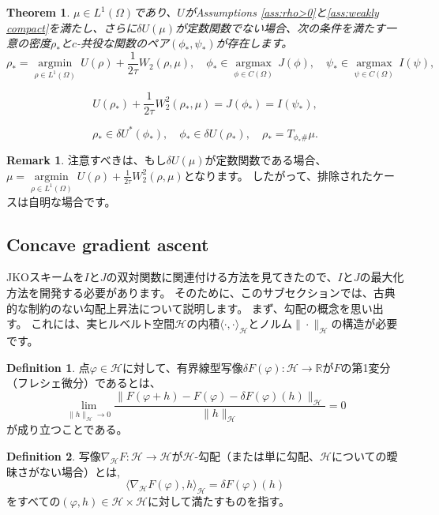 \documentclass{jsarticle}
\newtheorem{thm}{Theorem}[section]
\theoremstyle{definition}
\newtheorem{dfn}{Definition}[section]
\newtheorem{rem}{Remark}[section]
\begin{document}
{\color{teal}
\begin{thm}
\label{thm: duality}
    $\mu \in L^1(\Omega)$であり、$U$がAssumptions \ref{ass:rho>0}と\ref{ass:weakly compact}を満たし、さらに$\delta U(\mu)$が定数関数でない場合、次の条件を満たす一意の密度$\rho_*$と$c$-共役な関数のペア$(\phi_*, \psi_*)$が存在します。
\begin{equation*}
    \rho_* = \underset{\rho \in L^1(\Omega)} {\operatorname{argmin}} \, U(\rho) + \frac{1}{2\tau} W_2(\rho, \mu), \quad \phi_* \in \underset{\phi \in C(\Omega)} {\operatorname{argmax}} \, J(\phi), \quad \psi_* \in \underset{\psi \in C(\Omega)} {\operatorname{argmax}} \, I(\psi),
\end{equation*}

\begin{equation*}
U(\rho_*) + \frac{1}{2\tau} W_2^2(\rho_*,\mu) = J(\phi_*) = I(\psi_*), 
\end{equation*}

\begin{equation*}
    \rho_* \in \delta U^*(\phi_*), \quad \phi_* \in \delta U(\rho_*), \quad \rho_* = T_{\phi_* \#} \mu.
\end{equation*}
\end{thm}
}

\begin{rem}
    注意すべきは、もし$\delta U(\mu)$が定数関数である場合、$\mu = \underset{\rho \in L^1(\Omega)} {\operatorname{argmin}} \, U(\rho) + \frac{1}{2\tau} W_2^2(\rho, \mu)$となります。
    したがって、排除されたケースは自明な場合です。
\end{rem}

\subsection{Concave gradient ascent}
\label{sect:Concave gradient ascent}

JKOスキームを$I$と$J$の双対関数に関連付ける方法を見てきたので、$I$と$J$の最大化方法を開発する必要があります。
そのために、このサブセクションでは、古典的な制約のない勾配上昇法について説明します。
まず、勾配の概念を思い出す。
これには、実ヒルベルト空間$\mathcal{H}$の内積$\langle\cdot,\cdot\rangle_\mathcal{H}$とノルム$\|\cdot\|_\mathcal{H}$の構造が必要です。

\begin{dfn}
    点$\varphi\in \mathcal{H}$に対して、有界線型写像$\delta F(\varphi): \mathcal{H} \to \mathbb{R}$が$F$の第1変分（フレシェ微分）であるとは、
    \[
        \lim_{\|h\|_{\mathcal{H}} \to 0} \frac{\|F(\varphi + h) - F(\varphi) - \delta F(\varphi)(h)\|_{\mathcal{H}}}{\|h\|_{\mathcal{H}}} = 0
    \]
    が成り立つことである。
\end{dfn}
\begin{dfn}
    写像$\nabla_\mathcal{H} F: \mathcal{H} \to \mathcal{H}$が$\mathcal{H}$-勾配（または単に勾配、$\mathcal{H}$についての曖昧さがない場合）とは,
    \[
        \langle \nabla_\mathcal{H} F(\varphi), h \rangle_\mathcal{H} = \delta F(\varphi)(h)
    \]
    をすべての$(\varphi, h) \in \mathcal{H} \times \mathcal{H}$に対して満たすものを指す。
\end{dfn}
\end{document}
